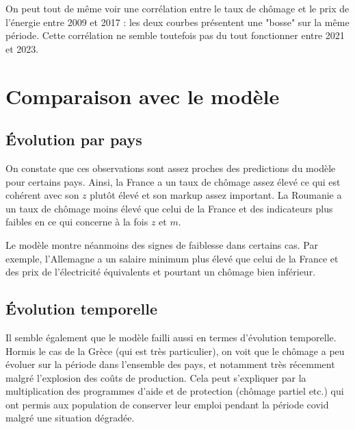 \documentclass{article}
\begin{document}
On peut tout de même voir une corrélation entre le taux de chômage et le prix de l'énergie entre 2009 et 2017 : les deux courbes présentent une "bosse" sur la même période. Cette corrélation ne semble toutefois pas du tout fonctionner entre 2021 et 2023.

\section{Comparaison avec le modèle}

\subsection{Évolution par pays}
On constate que ces observations sont assez proches des predictions du modèle pour certains pays. Ainsi, la France a un taux de chômage assez élevé ce qui est cohérent avec son $z$ plutôt élevé et son markup assez important. La Roumanie a un taux de chômage moins élevé que celui de la France et des indicateurs plus faibles en ce qui concerne à la fois $z$ et $m$.

Le modèle montre néanmoins des signes de faiblesse dans certains cas. Par exemple, l'Allemagne a un salaire minimum plus élevé que celui de la France et des prix de l'électricité équivalents et pourtant un chômage bien inférieur.

\subsection{Évolution temporelle}

Il semble également que le modèle failli aussi en termes d'évolution temporelle. Hormis le cas de la Grèce (qui est très particulier), on voit que le chômage a peu évoluer sur la période dans l'ensemble des pays, et notamment très récemment malgré l'explosion des coûts de production. Cela peut s'expliquer par la multiplication des programmes d'aide et de protection (chômage partiel etc.) qui ont permis aux population de conserver leur emploi pendant la période covid malgré une situation dégradée. 
\end{document}
